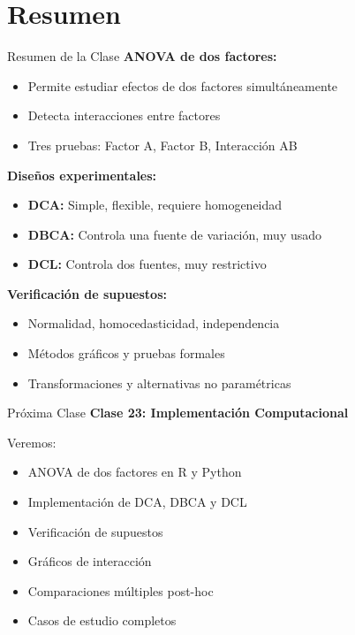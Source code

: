 \documentclass[aspectratio=169]{beamer}
\begin{document}
\section{Resumen}

\begin{frame}{Resumen de la Clase}
\textbf{ANOVA de dos factores:}
\begin{itemize}
\item Permite estudiar efectos de dos factores simultáneamente
\item Detecta interacciones entre factores
\item Tres pruebas: Factor A, Factor B, Interacción AB
\end{itemize}

\vspace{0.3cm}
\textbf{Diseños experimentales:}
\begin{itemize}
\item \textbf{DCA:} Simple, flexible, requiere homogeneidad
\item \textbf{DBCA:} Controla una fuente de variación, muy usado
\item \textbf{DCL:} Controla dos fuentes, muy restrictivo
\end{itemize}

\vspace{0.3cm}
\textbf{Verificación de supuestos:}
\begin{itemize}
\item Normalidad, homocedasticidad, independencia
\item Métodos gráficos y pruebas formales
\item Transformaciones y alternativas no paramétricas
\end{itemize}
\end{frame}

\begin{frame}{Próxima Clase}
\textbf{Clase 23: Implementación Computacional}

\vspace{0.3cm}
Veremos:
\begin{itemize}
\item ANOVA de dos factores en R y Python
\item Implementación de DCA, DBCA y DCL
\item Verificación de supuestos
\item Gráficos de interacción
\item Comparaciones múltiples post-hoc
\item Casos de estudio completos
\end{itemize}
\end{frame}
\end{document}
